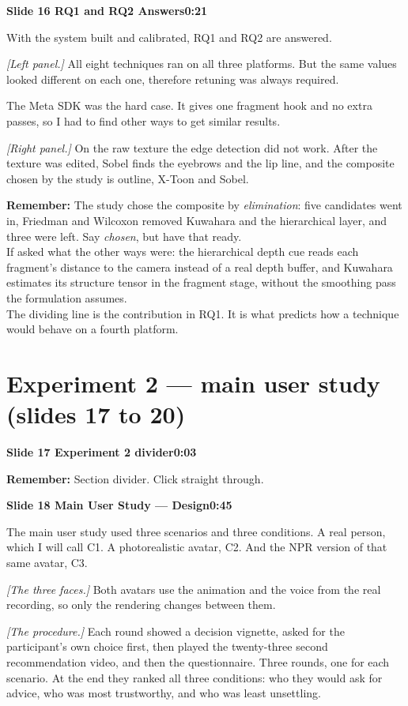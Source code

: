 \documentclass[11pt,a4paper]{article}
\newcommand{\slidehead}[3]{%
  \needspace{5\baselineskip}
  \vspace{0.9em}
  \noindent\colorbox{knblue}{\parbox{0.978\textwidth}{\vspace{1pt}\color{white}\textbf{Slide #1 \quad #2}\hfill\textbf{#3}\vspace{1pt}}}
  \vspace{0.35em}\par}
\newcommand{\remind}[1]{%
  \vspace{0.15em}
  \noindent\colorbox{knlight}{\parbox{0.972\textwidth}{\small\color{knblue}\textbf{Remember:} #1}}
  \vspace{0.2em}\par}
\newcommand{\pointto}[1]{{\color{knaccent}\textit{[#1]}}}
\begin{document}
\slidehead{16}{RQ1 and RQ2 Answers}{0:21}

With the system built and calibrated, RQ1 and RQ2 are answered.

\pointto{Left panel.} All eight techniques ran on all three platforms. But the same values looked different on each one, therefore retuning was always required.

The Meta SDK was the hard case. It gives one fragment hook and no extra passes, so I had to find other ways to get similar results.

\pointto{Right panel.} On the raw texture the edge detection did not work. After the texture was edited, Sobel finds the eyebrows and the lip line, and the composite chosen by the study is outline, X-Toon and Sobel.

\remind{The study chose the composite by \emph{elimination}: five candidates went in, Friedman and Wilcoxon removed Kuwahara and the hierarchical layer, and three were left. Say \emph{chosen}, but have that ready.\\[0.4em] If asked what the other ways were: the hierarchical depth cue reads each fragment's distance to the camera instead of a real depth buffer, and Kuwahara estimates its structure tensor in the fragment stage, without the smoothing pass the formulation assumes.\\[0.4em] The dividing line is the contribution in RQ1. It is what predicts how a technique would behave on a fourth platform.}

\section*{\color{knblue}Experiment 2 — main user study (slides 17 to 20)}

\slidehead{17}{Experiment 2 divider}{0:03}

\remind{Section divider. Click straight through.}

\slidehead{18}{Main User Study — Design}{0:45}

The main user study used three scenarios and three conditions. A real person, which I will call C1. A photorealistic avatar, C2. And the NPR version of that same avatar, C3.

\pointto{The three faces.} Both avatars use the animation and the voice from the real recording, so only the rendering changes between them.

\pointto{The procedure.} Each round showed a decision vignette, asked for the participant's own choice first, then played the twenty-three second recommendation video, and then the questionnaire. Three rounds, one for each scenario. At the end they ranked all three conditions: who they would ask for advice, who was most trustworthy, and who was least unsettling.
\end{document}
